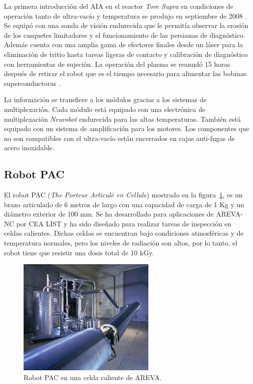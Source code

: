 La primera introducción del AIA en el reactor \textit{Tore Supra} en condiciones de operación tanto de ultra-vacío y temperatura se produjo en septiembre de 2008 \cite{Keller2009}.
Se equipó con una sonda de visión endurecida que le permitía observar la erosión de los casquetes limitadores y el funcionamiento de las persianas de diagnóstico.
Además cuenta con una amplia gama de efectores finales desde un láser para la eliminación de tritio hasta tareas ligeras de contacto y calibración de diagnóstico con herramientas de sujeción.
La operación del plasma se reanudó 15 horas después de retirar el robot que es el tiempo necesario para alimentar las bobinas superconductoras \cite{Gargiulo2009}.

La información se transfiere a los módulos gracias a los sistemas de multiplexación.
Cada módulo está equipado con una electrónica de multiplexación \textit{Neurobot} endurecida para las altas temperaturas. También está equipado con un sistema de amplificación para los motores.
Los componentes que no son compatibles con el ultra-vacío están encerrados en cajas anti-fugas de acero inoxidable.

\subsection*{Robot PAC}
\label{robotPAC:sub}
El robot PAC (\textit{The Porteur Articulé en Cellule}) \cite{Perrot2004} mostrado en la figura~\ref{fig:PAC}, es un brazo articulado de 6 metros de largo con una capacidad de carga de 1 Kg y un diámetro exterior de 100 mm.
Se ha desarrollado para aplicaciones de AREVA-NC por CEA LIST y ha sido diseñado para realizar tareas de inspección en celdas calientes. Dichas celdas se encuentran bajo condiciones atmosféricas y de temperatura normales, pero los niveles de radiación son altos, por lo tanto, el robot tiene que resistir una dosis total de 10 kGy.

\begin{figure}[htbp] 
   \centering
   \includegraphics[width=0.6\textwidth]{FiguresSoA/PAC}
   \caption{Robot PAC en una celda caliente de AREVA.}
   \label{fig:PAC} 
\end{figure}

